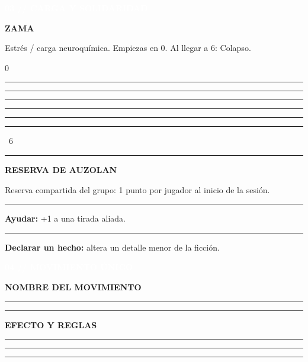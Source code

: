 \documentclass[10pt,a4paper,oneside]{book}
\newcommand{\rulefield}[2][\linewidth]{%
  \begin{minipage}[t]{#1}
  \textcolor{InkSoft}{\industrialfont\scriptsize\bfseries\MakeUppercase{#2}}\par
  \vspace{1mm}\textcolor{Line}{\rule{\linewidth}{0.45pt}}
  \end{minipage}}
\newcommand{\strip}[1]{%
  \vspace{1mm}\noindent
  \colorbox{CarbonDark}{\parbox{\dimexpr\linewidth-2\fboxsep\relax}{%
    \textcolor{white}{\industrialfont\bfseries\small\MakeUppercase{#1}}}}\par
  \vspace{1mm}}
\newcommand{\checkline}[2]{%
  \textcolor{#1}{\rule{2.6mm}{2.6mm}}\hspace{1.2mm}\textcolor{InkSoft}{\scriptsize #2}}
\begin{document}
\begin{minipage}[t]{0.48\linewidth}
  \strip{03 // Carga y solidaridad}
  \begin{tcolorbox}[enhanced,colback=GoldPale,colframe=GoldDark,boxrule=.6pt,
    arc=1mm,left=5pt,right=5pt,top=3pt,bottom=3pt,height=50mm]
    {\industrialfont\bfseries\color{GoldDark}ZAMA}\par
    \textcolor{InkSoft}{\scriptsize Estrés / carga neuroquímica. Empiezas en 0. Al llegar a 6: Colapso.}\par
    \vspace{3mm}
    \begin{center}
      \textcolor{InkSoft}{\scriptsize 0}\quad
      \checkline{AcidSirimiri}{}\quad
      \checkline{AcidSirimiri}{}\quad
      \checkline{AcidSirimiri}{}\quad
      \checkline{AcidSirimiri}{}\quad
      \checkline{AcidSirimiri}{}\quad
      \textcolor{OrekakRust}{\rule{3mm}{3mm}}\ \textcolor{OrekakRust}{\scriptsize 6}
    \end{center}
    \vspace{1mm}\textcolor{Line}{\rule{\linewidth}{.4pt}}\vspace{2mm}
    {\industrialfont\bfseries\color{GoldDark}RESERVA DE AUZOLAN}\par
    \textcolor{InkSoft}{\scriptsize Reserva compartida del grupo: 1 punto por jugador al inicio de la sesión.}\par
    \vspace{1mm}
    {\color{InkSoft}\scriptsize
      \checkline{GoldDark}{} \textbf{Ayudar:} +1 a una tirada aliada.\par\vspace{1mm}
      \checkline{GoldDark}{} \textbf{Declarar un hecho:} altera un detalle menor de la ficción.}
  \end{tcolorbox}
\end{minipage}

\strip{04 // Movimiento único}

\begin{tcolorbox}[enhanced,colback=RustPale,colframe=OrekakRust,boxrule=.7pt,
  arc=1mm,left=6pt,right=6pt,top=3pt,bottom=3pt]
  \begin{minipage}[t]{0.32\linewidth}
    \rulefield{Nombre del movimiento}\par\vspace{3mm}
    \textcolor{Line}{\rule{\linewidth}{.4pt}}
  \end{minipage}\hfill
  \begin{minipage}[t]{0.62\linewidth}
    \rulefield{Efecto y reglas}\par\vspace{3mm}
    \textcolor{Line}{\rule{\linewidth}{.4pt}}\par\vspace{3mm}
    \textcolor{Line}{\rule{\linewidth}{.4pt}}
  \end{minipage}
\end{tcolorbox}
\end{document}

